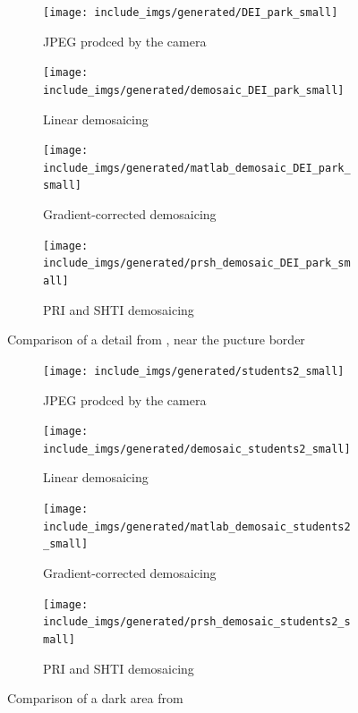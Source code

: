 \documentclass[a4paper,oneside]{article}
\begin{document}
\begin{figure}[htbp]
  \centering
  \begin{subfigure}{.4\textwidth}
    \centering
    \texttt{[image: include\_imgs/generated/DEI\_park\_small]}
    \caption{JPEG prodced by the camera}
  \end{subfigure}%
  \begin{subfigure}{.4\textwidth}
    \centering
    \texttt{[image: include\_imgs/generated/demosaic\_DEI\_park\_small]}
    \caption{Linear demosaicing}
  \end{subfigure}
  \begin{subfigure}{.4\textwidth}
    \centering
    \texttt{[image: include\_imgs/generated/matlab\_demosaic\_DEI\_park\_small]}
    \caption{Gradient-corrected demosaicing}
  \end{subfigure}%
  \begin{subfigure}{.4\textwidth}
    \centering
    \texttt{[image: include\_imgs/generated/prsh\_demosaic\_DEI\_park\_small]}
    \caption{PRI and SHTI demosaicing}
  \end{subfigure}
  \caption{Comparison of a detail from , near
    the pucture border}
  \label{fig:park}
\end{figure}

\begin{figure}[htbp]
  \centering
  \begin{subfigure}{.4\textwidth}
    \centering
    \texttt{[image: include\_imgs/generated/students2\_small]}
    \caption{JPEG prodced by the camera}
  \end{subfigure}%
  \begin{subfigure}{.4\textwidth}
    \centering
    \texttt{[image: include\_imgs/generated/demosaic\_students2\_small]}
    \caption{Linear demosaicing}
  \end{subfigure}
  \begin{subfigure}{.4\textwidth}
    \centering
    \texttt{[image: include\_imgs/generated/matlab\_demosaic\_students2\_small]}
    \caption{Gradient-corrected demosaicing}
  \end{subfigure}%
  \begin{subfigure}{.4\textwidth}
    \centering
    \texttt{[image: include\_imgs/generated/prsh\_demosaic\_students2\_small]}
    \caption{PRI and SHTI demosaicing}
  \end{subfigure}
  \caption{Comparison of a dark area from }
  \label{fig:students}
\end{figure}
\end{document}
